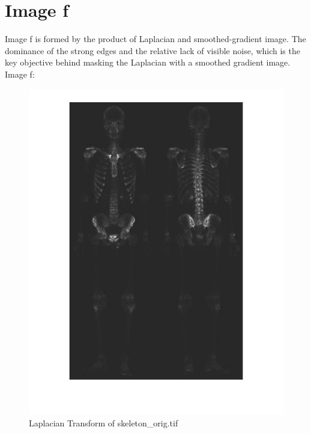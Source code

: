 \documentclass[11pt,oneside]{book}
\begin{document}
\section{Image f}
Image f is formed by the product of Laplacian and smoothed-gradient image.
The dominance of the strong edges and the relative lack of visible noise, which is the key objective behind masking the Laplacian with a smoothed gradient image.\\
Image f:
\begin{figure}[!htb]
   \centering  
   \includegraphics[width=1.0\textwidth]{images/2/f.jpg}
   \caption{Laplacian Transform of skeleton\_orig.tif}  
\end{figure}
\end{document}
